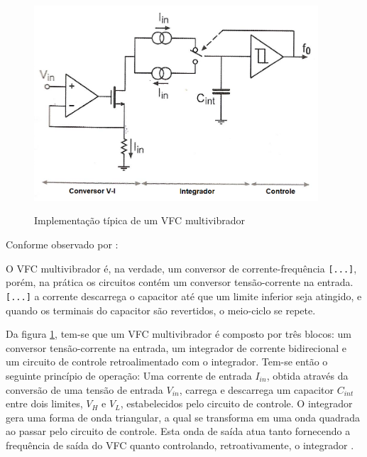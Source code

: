 \documentclass[
	12pt,				%
	oneside,			%
	a4paper,			%
	english,			%
	french,				%
	spanish,			%
	brazil				%
	]{abntex2}
\begin{document}
\begin{figure}[!ht]
  \centering
  \includegraphics[width=300pt]{modeloVFC.png}\\
  \caption{Implementação típica de um VFC multivibrador}\label{modeloVFC}
\end{figure}

Conforme observado por :
\begin{citacao}
O VFC multivibrador é, na verdade, um conversor de corrente-frequência \verb|[...]|, porém, na prática os circuitos contém um conversor tensão-corrente na entrada. \verb|[...]| a corrente descarrega o capacitor até que um limite inferior seja atingido, e quando os terminais do capacitor são revertidos, o meio-ciclo se repete.
\end{citacao}

Da figura \ref{modeloVFC}, tem-se que um VFC multivibrador é composto por três blocos: um conversor tensão-corrente na entrada, um integrador de corrente bidirecional e um circuito de controle retroalimentado com o integrador. Tem-se então o seguinte princípio de operação: Uma corrente de entrada \(I_{in}\), obtida através da conversão de uma tensão de entrada \(V_{in}\), carrega e descarrega um capacitor \(C_{int}\) entre dois limites, \(V_{H}\) e \(V_{L}\), estabelecidos pelo circuito de controle. O integrador gera uma forma de onda triangular, a qual se transforma em uma onda quadrada ao passar pelo circuito de controle. Esta onda de saída atua tanto fornecendo a frequência de saída do VFC quanto controlando, retroativamente, o integrador \cite{VFCbook}.
\end{document}

